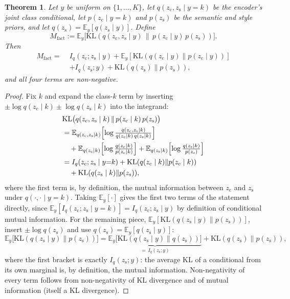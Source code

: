 \documentclass[letterpaper]{article} %
\newtheorem{theorem}{Theorem}
\newcommand{\zc}{z_{\mathrm{c}}}
\newcommand{\zs}{z_{\mathrm{s}}}
\newcommand{\KL}{\mathrm{KL}}
\begin{document}
\begin{theorem}
Let $y$ be uniform on $\{1,\dots,K\}$, let $q(\zc,\zs\mid y{=}k)$ be the
encoder's joint class conditional, let $p(\zc\mid y{=}k)$ and $p(\zs)$ be the
semantic and style priors, and let $q(\zs)=\mathbb E_y[q(\zs\mid y)]$. Define
\[
M_{\mathrm{fact}} := \mathbb E_y\bigl[\KL(q(\zc,\zs\mid y)\,\|\,p(\zc\mid y)\,p(\zs))\bigr].
\]
Then
\begin{align*}
M_{\mathrm{fact}} =\;& I_q(\zc;\zs\mid y)
 + \mathbb E_y[\KL(q(\zc\mid y)\|p(\zc\mid y))]\\
 &+ I_q(\zs;y) + \KL(q(\zs)\|p(\zs)),
\end{align*}
and all four terms are non-negative.
\end{theorem}

\begin{proof}
Fix $k$ and expand the class-$k$ term by inserting $\pm\log q(\zc\mid
k)\pm\log q(\zs\mid k)$ into the integrand:
\begin{align*}
&\KL\bigl(q(\zc,\zs\mid k)\,\|\,p(\zc\mid k)\,p(\zs)\bigr) \\
&= \mathbb E_{q(\zc,\zs\mid k)}\Bigl[\log\tfrac{q(\zc,\zs\mid k)}{q(\zc\mid k)\,q(\zs\mid k)}\Bigr]\\
&\quad + \mathbb E_{q(\zc\mid k)}\Bigl[\log\tfrac{q(\zc\mid k)}{p(\zc\mid k)}\Bigr]
 + \mathbb E_{q(\zs\mid k)}\Bigl[\log\tfrac{q(\zs\mid k)}{p(\zs)}\Bigr] \\
&= I_q(\zc;\zs\mid y{=}k) + \KL(q(\zc\mid k)\|p(\zc\mid k))\\
&\quad + \KL(q(\zs\mid k)\|p(\zs)),
\end{align*}
where the first term is, by definition, the mutual information between $\zc$
and $\zs$ under $q(\cdot,\cdot\mid y{=}k)$. Taking $\mathbb E_y[\cdot]$ gives
the first two terms of the statement directly, since $\mathbb
E_y[I_q(\zc;\zs\mid y{=}k)]=I_q(\zc;\zs\mid y)$ by definition of conditional
mutual information. For the remaining piece, $\mathbb E_y[\KL(q(\zs\mid
y)\|p(\zs))]$, insert $\pm\log q(\zs)$ and use $q(\zs)=\mathbb E_y[q(\zs\mid
y)]$:
\[
\mathbb E_y\bigl[\KL(q(\zs\mid y)\|p(\zs))\bigr]
 = \underbrace{\mathbb E_y\bigl[\KL(q(\zs\mid y)\|q(\zs))\bigr]}_{=\,I_q(\zs;y)}
 + \KL(q(\zs)\|p(\zs)),
\]
where the first bracket is exactly $I_q(\zs;y)$: the average KL of a
conditional from its own marginal is, by definition, the mutual information.
Non-negativity of every term follows from non-negativity of KL divergence and
of mutual information (itself a KL divergence).
\end{proof}
\end{document}
